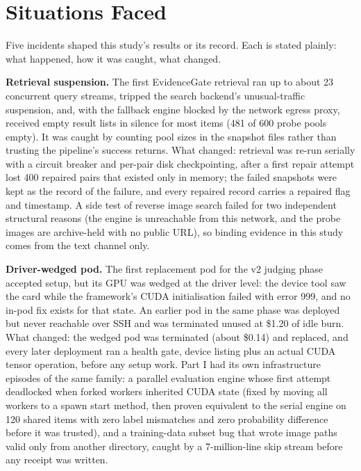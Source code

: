\documentclass{article} %
\begin{document}
\section{Situations Faced}
\label{sec:situations}
Five incidents shaped this study's results or its record. Each is stated plainly: what happened, how it was caught, what changed.

\textbf{Retrieval suspension.} The first EvidenceGate retrieval ran up to about 23 concurrent query streams, tripped the search backend's unusual-traffic suspension, and, with the fallback engine blocked by the network egress proxy, received empty result lists in silence for most items (481 of 600 probe pools empty). It was caught by counting pool sizes in the snapshot files rather than trusting the pipeline's success returns. What changed: retrieval was re-run serially with a circuit breaker and per-pair disk checkpointing, after a first repair attempt lost 400 repaired pairs that existed only in memory; the failed snapshots were kept as the record of the failure, and every repaired record carries a repaired flag and timestamp. A side test of reverse image search failed for two independent structural reasons (the engine is unreachable from this network, and the probe images are archive-held with no public URL), so binding evidence in this study comes from the text channel only.

\textbf{Driver-wedged pod.} The first replacement pod for the v2 judging phase accepted setup, but its GPU was wedged at the driver level: the device tool saw the card while the framework's CUDA initialisation failed with error 999, and no in-pod fix exists for that state. An earlier pod in the same phase was deployed but never reachable over SSH and was terminated unused at \$1.20 of idle burn. What changed: the wedged pod was terminated (about \$0.14) and replaced, and every later deployment ran a health gate, device listing plus an actual CUDA tensor operation, before any setup work. Part I had its own infrastructure episodes of the same family: a parallel evaluation engine whose first attempt deadlocked when forked workers inherited CUDA state (fixed by moving all workers to a spawn start method, then proven equivalent to the serial engine on 120 shared items with zero label mismatches and zero probability difference before it was trusted), and a training-data subset bug that wrote image paths valid only from another directory, caught by a 7-million-line skip stream before any receipt was written.
\end{document}
